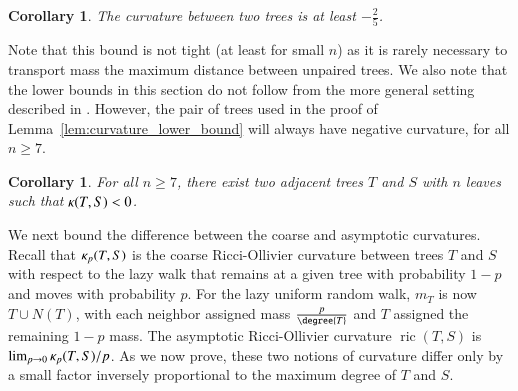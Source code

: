\documentclass[]{elsarticle}
\newtheorem{cor}[thm]{Corollary}
\newcommand{\curvature}[2][]{%
    \ifthenelse{\equal{#1}{}}%
		{\kappa(#2)}%
		{\kappa_{#1}(#2)}%
}
\newcommand{\ric}[1]{
	\operatorname{ric}(#1)%
}
\begin{document}
\begin{cor}
	The curvature between two trees is at least $-\frac{2}{5}$.
\end{cor}

Note that this bound is not tight (at least for small $n$) as it is rarely necessary to transport mass the maximum distance between unpaired trees.
We also note that the lower bounds in this section do not follow from the more general setting described in \citep{Jost2013-ce}.
However, the pair of trees used in the proof of Lemma~\ref{lem:curvature_lower_bound} will always have negative curvature, for all $n \ge 7$.

\begin{cor}
For all $n \ge 7$, there exist two adjacent trees $T$ and $S$ with $n$ leaves such that $\curvature{T,S} < 0$.
\end{cor}

We next bound the difference between the coarse and asymptotic curvatures.
Recall that $\curvature[p]{T,S}$ is the coarse Ricci-Ollivier curvature between trees $T$ and $S$ with respect to the lazy walk that remains at a given tree with probability $1-p$ and moves with probability $p$.
For the lazy uniform random walk, $m_T$ is now $T \cup N(T)$, with each neighbor assigned mass $\frac{p}{\degree{T}}$ and $T$ assigned the remaining $1 - p$ mass.
The asymptotic Ricci-Ollivier curvature $\ric{T,S}$ is $\lim_{p \rightarrow 0} \curvature[p]{T,S} / p$.
As we now prove, these two notions of curvature differ only by a small factor inversely proportional to the maximum degree of $T$ and $S$.
\end{document}
